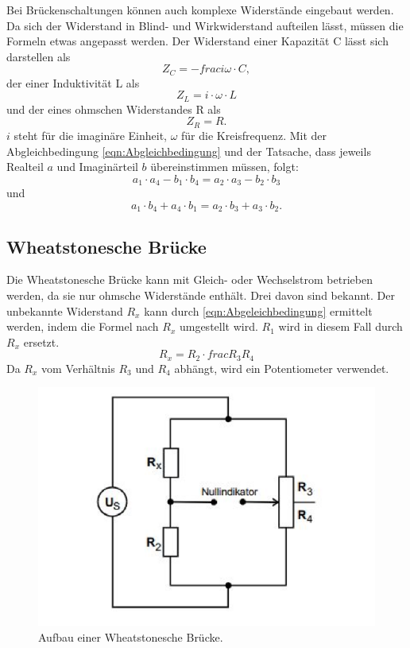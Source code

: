 Bei Brückenschaltungen können auch komplexe Widerstände eingebaut werden.
Da sich der Widerstand in Blind- und Wirkwiderstand aufteilen lässt, müssen die Formeln etwas angepasst werden.
Der Widerstand einer Kapazität C lässt sich darstellen als 
\begin{equation}
    Z_C = - frac{i}{\omega \cdot C} ,
\end{equation}
der einer Induktivität L als 
\begin{equation}
    Z_L = i \cdot \omega \cdot L 
\end{equation}
und der eines ohmschen Widerstandes R als
\begin{equation}
    Z_R = R .
\end{equation}
$i$ steht für die imaginäre Einheit, $\omega$ für die Kreisfrequenz.
Mit der Abgleichbedingung \ref{eqn:Abgleichbedingung} und der Tatsache, dass jeweils Realteil $a$ und Imaginärteil $b$ übereinstimmen müssen, folgt:
\begin{equation}
    a_1 \cdot a_4 - b_1 \cdot b_4 = a_2 \cdot a_3 - b_2 \cdot b_3 
\end{equation}
und
\begin{equation}
    a_1 \cdot b_4 + a_4 \cdot b_1 = a_2 \cdot b_3 + a_3 \cdot b_2 .
\end{equation}

\subsection{Wheatstonesche Brücke}

Die Wheatstonesche Brücke kann mit Gleich- oder Wechselstrom betrieben werden, da sie nur ohmsche Widerstände enthält. 
Drei davon sind bekannt.
Der unbekannte Widerstand $R_x$ kann durch \eqref{eqn:Abgeleichbedingung} ermittelt werden, indem die Formel nach $R_x$ umgestellt wird.
$R_1$ wird in diesem Fall durch $R_x$ ersetzt.
\begin{equation}
    R_x = R_2 \cdot frac{R_3}{R_4}
\end{equation}
Da $R_x$ vom Verhältnis $R_3$ und $R_4$ abhängt, wird ein Potentiometer verwendet.

\begin{figure}
    \centering
    \includegraphics[width=\textwidth]{wheatBruecke.pdf}
    \caption{Aufbau einer Wheatstonesche Brücke.\cite[4]{anleitung}}
\end{figure}

